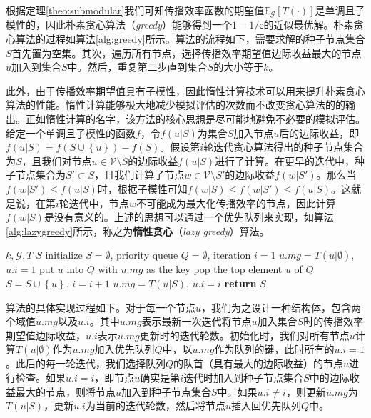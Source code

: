 根据定理\ref{theo:submodular}我们可知传播效率函数的期望值$\mathbb{E}_\mathcal{G}\left[T\left(\cdot\right)\right]$是单调且子模性的，因此朴素贪心算法（\textit{greedy}）能够得到一个$1-1/\mathsf{e}$的近似最优解。朴素贪心算法的过程如算法\ref{alg:greedy}所示。算法的流程如下，需要求解的种子节点集合$S$首先置为空集。其次，遍历所有节点，选择传播效率期望值边际收益最大的节点$u$加入到集合$S$中。然后，重复第二步直到集合$S$的大小等于$k$。

此外，由于传播效率期望值具有子模性，因此惰性计算技术可以用来提升朴素贪心算法的性能。惰性计算能够极大地减少模拟评估的次数而不改变贪心算法的的输出。正如惰性计算的名字，该方法的核心思想是尽可能地避免不必要的模拟评估。给定一个单调且子模性的函数$f$，令$f\left(u|S\right)$为集合$S$加入节点$u$后的边际收益，即$f\left(u|S\right) = f\left( S \cup \left\{u\right\} \right) - f\left( S \right)$。假设第$i$轮迭代贪心算法得出的种子节点集合为$S$，且我们对节点$u \in \mathcal{V} \setminus S$的边际收益$f\left(u|S\right)$进行了计算。在更早的迭代中，种子节点集合为$S' \subset S$，且我们计算了节点$w \in \mathcal{V} \setminus S'$的边际收益$f\left(w|S'\right)$。那么当$f\left(w|S'\right) \leq f\left(u|S\right)$时，根据子模性可知$f\left(w|S\right) \leq f\left(w|S'\right) \leq f\left(u|S\right)$。这就是说，在第$i$轮迭代中，节点$w$不可能成为最大化传播效率的节点，因此计算$f\left(w|S\right)$是没有意义的。上述的思想可以通过一个优先队列来实现，如算法\ref{alg:lazygreedy}所示，称之为\textbf{惰性贪心}（\textit{lazy greedy}）算法。

\begin{algorithm}[!ht]
    \caption{$LazyGreedy(k,T)$}
    \label{alg:lazygreedy}
    \begin{algorithmic}[1]
	\REQUIRE $k,\mathcal{G},T$
    \ENSURE $S$
    \STATE initialize $S=\emptyset$, priority queue $Q=\emptyset$, iteration $i=1$
        \STATE $u.mg=T\left(u|\emptyset\right)$, $u.i=1$
        \STATE put $u$ into $Q$ with $u.mg$ as the key
    \ENDFOR
        \STATE pop the top element $u$ of $Q$
            \STATE $S = S \cup \left\{u\right\}$, $i=i+1$
        \ELSE
            \STATE $u.mg=T\left(u|S\right)$,  $u.i=i$ 
        \ENDIF
    \ENDWHILE
    \STATE \textbf{return} $S$
    \end{algorithmic}
\end{algorithm}

算法的具体实现过程如下。对于每一个节点$u$，我们为之设计一种结构体，包含两个域值$u.mg$以及$u.i$。其中$u.mg$表示最新一次迭代将节点$u$加入集合$S$时的传播效率期望值边际收益，$u.i$表示$u.mg$更新时的迭代轮数。初始化时，我们对所有节点$u$计算$T\left(u|\emptyset\right)$作为$u.mg$加入优先队列$Q$中，以$u.mg$作为队列的键，此时所有的$u.i=1$。此后的每一轮迭代，我们选择队列$Q$的队首（具有最大的边际收益）的节点$u$进行检查。如果$u.i=i$，即节点$u$确实是第$i$迭代时加入到种子节点集合$S$中的边际收益最大的节点，则将节点$u$加入到种子节点集合$S$中。如果$u.i \neq i$，则更新$u.mg$为$T\left(u|S\right)$，更新$u.i$为当前的迭代轮数，然后将节点$u$插入回优先队列$Q$中。

